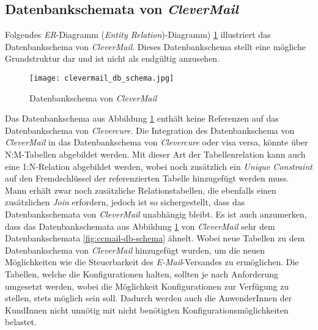 \subsection{Datenbankschemata von \emph{CleverMail}}
Folgendes \emph{ER}-Diagramm (\emph{Entity Relation})-Diagramm) \ref{fig:clevermail-db-schema} illustriert das Datenbankschema von \emph{CleverMail}. Dieses Datenbankschema stellt eine mögliche Grundstruktur dar und ist nicht als endgültig anzusehen.
\begin{figure}[H]
\centering
\texttt{[image: clevermail\_db\_schema.jpg]}
\caption{Datenbankschema von \emph{CleverMail}}
\label{fig:clevermail-db-schema}
\end{figure}
Das Datenbankschema aus Abbildung \ref{fig:clevermail-db-schema} enthält keine Referenzen auf das Datenbankschema von \emph{Clevercure}. Die Integration des Datenbankschema von \emph{CleverMail} in das Datenbankschema von \emph{Clevercure} oder visa versa, könnte über N:M-Tabellen abgebildet werden. Mit dieser Art der Tabellenrelation kann auch eine 1:N-Relation abgebildet werden, wobei noch zusätzlich ein \emph{Unique Constraint} auf den Fremdschlüssel der referenzierten Tabelle hinzugefügt werden muss. Mann erhält zwar noch zusätzliche Relationstabellen, die ebenfalls einen zusätzlichen \emph{Join} erfordern, jedoch ist so sichergestellt, dass das Datenbankschemata von \emph{CleverMail} unabhängig bleibt.
\newline
\newline
Es ist auch anzumerken, dass das Datenbankschemata aus Abbildung \ref{fig:clevermail-db-schema} von \emph{CleverMail} sehr dem Datenbankschemata \ref{fig:ccmail-db-schema} ähnelt. Wobei neue Tabellen zu dem Datenbankschema von \emph{CleverMail} hinzugefügt wurden, um die neuen Möglichkeiten wie die Steuerbarkeit des \emph{E-Mail}-Versandes zu ermöglichen. 
\newline
\newline
Die Tabellen, welche die Konfigurationen halten, sollten je nach Anforderung umgesetzt werden, wobei die Möglichkeit Konfigurationen zur Verfügung zu stellen, stets möglich sein soll. Dadurch werden auch die AnwenderInnen der KundInnen nicht unnötig mit nicht benötigten Konfigurationsmöglichkeiten belastet.
